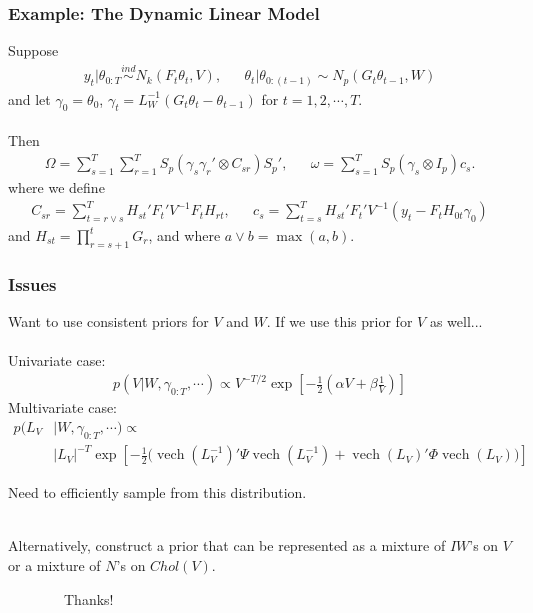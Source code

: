 \documentclass[xcolor=dvipsnames]{beamer}
\DeclareMathOperator{\vech}{vech}
\begin{document}
\begin{frame}
\frametitle{Example: The Dynamic Linear Model}
Suppose
\begin{align*}
y_t|\theta_{0:T} \stackrel{ind}{\sim} N_k(F_t\theta_t,V), && \theta_t|\theta_{0:(t-1)}\sim N_p(G_t\theta_{t-1},W)
\end{align*}
and let $\gamma_0=\theta_0$, $\gamma_t=L_W^{-1}(G_t\theta_t - \theta_{t-1})$ for $t=1,2,\cdots,T$.\\~\\
\pause
Then
\begin{align*}
  \Omega=\sum_{s=1}^T\sum_{r=1}^TS_p(\gamma_s\gamma_r'\otimes C_{sr})S_p', && \omega=\sum_{s=1}^TS_p(\gamma_s\otimes I_p)c_s.
\end{align*}
where we define 
\begin{align*}
C_{sr} = \sum_{t=r\vee s}^TH_{st}'F_t'V^{-1}F_tH_{rt}, && c_s=\sum_{t=s}^TH_{st}'F_t'V^{-1}(y_t - F_tH_{0t}\gamma_0)
\end{align*}
 and $H_{st} = \prod_{r=s+1}^tG_r$, and where $a\vee b = \max(a,b)$.
\end{frame}

\begin{frame}
\frametitle{Issues}
Want to use consistent priors for $V$ and $W$. If we use this prior for $V$ as well...\\~\\

Univariate case: 
\begin{align*}
p(V|W,\gamma_{0:T},\cdots)\propto V^{-T/2}\exp\left[-\frac{1}{2}\left(\alpha V + \beta \frac{1}{V}\right)\right]
\end{align*}
\pause
Multivariate case: 
\begin{align*}
p(L_V&|W,\gamma_{0:T},\cdots)\propto\\
&|L_V|^{-T}\exp\left[-\frac{1}{2}\bigg(\vech(L_V^{-1})'\Psi\vech(L_V^{-1}) + \vech(L_V)'\Phi\vech(L_V)  \bigg)\right]
\end{align*}

Need to efficiently sample from this distribution.\\~\\
\pause

Alternatively, construct a prior that can be represented as a mixture of $IW$'s on $V$ or a mixture of $N$'s on $Chol(V)$.
\end{frame}

\begin{frame}
\Huge \ \ \ \ \ \ \ \ Thanks!
\end{frame}



\end{document}
